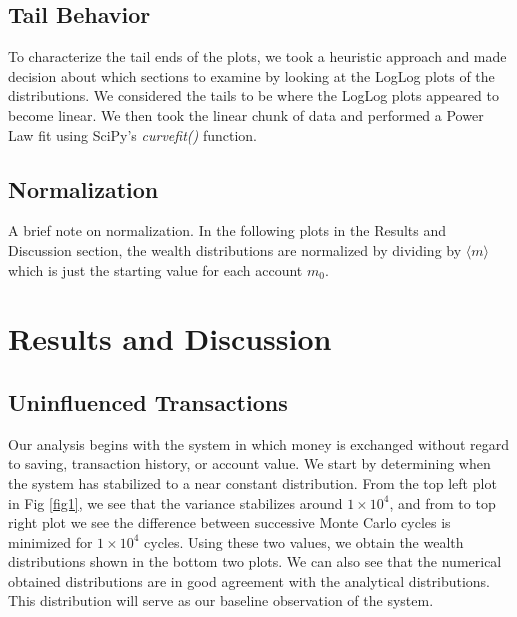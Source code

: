 \documentclass{emulateapj}
\begin{document}
\subsection{Tail Behavior}
To characterize the tail ends of the plots, we took a heuristic approach and made decision about which sections to examine by looking at the LogLog plots of the distributions. We considered the tails to be where the LogLog plots appeared to become linear. We then took the linear chunk of data and performed a Power Law fit using SciPy's \textit{curve\textunderscore fit()} function.
\subsection{Normalization}
A brief note on normalization. In the following plots in the Results and Discussion section, the wealth distributions are normalized by dividing by $\langle m \rangle$ which is just the starting value for each account $m_0$.
\section{Results and Discussion}
\subsection{Uninfluenced Transactions}
Our analysis begins with the system in which money is exchanged without regard to saving, transaction history, or account value. We start by determining when the system has stabilized to a near constant distribution. From the top left plot in Fig \ref{fig1}, we see that the variance stabilizes around $1\times10^4$, and from to top right plot we see the difference between successive Monte Carlo cycles is minimized for $1\times10^4$ cycles. Using these two values, we obtain the wealth distributions shown in the bottom two plots. We can also see that the numerical obtained distributions are in good agreement with the analytical distributions. This distribution will serve as our baseline observation of the system.
\end{document}
